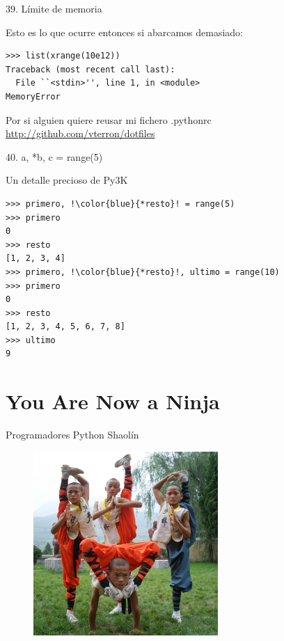 \documentclass[14pt]{beamer}
\begin{document}
\begin{frame}[fragile]{39. Límite de memoria}
  \footnotesize
  \begin{exampleblock}
    {Esto es lo que ocurre entonces si abarcamos demasiado:}
    \begin{lstlisting}
>>> list(xrange(10e12))
Traceback (most recent call last):
  File ``<stdin>'', line 1, in <module>
MemoryError
    \end{lstlisting}
  \end{exampleblock}

  \small
  \begin{block}
    {\centering Por si alguien quiere reusar mi fichero .pythonrc}
    \centering \url{http://github.com/vterron/dotfiles}
  \end{block}
\end{frame}

\begin{frame}[fragile]{40. a, *b, c = range(5)}
  \begin{exampleblock}
    {\centering Un detalle precioso de Py3K}
    \small
    \begin{lstlisting}[escapechar=!]
>>> primero, !\color{blue}{*resto}! = range(5)
>>> primero
0
>>> resto
[1, 2, 3, 4]
>>> primero, !\color{blue}{*resto}!, ultimo = range(10)
>>> primero
0
>>> resto
[1, 2, 3, 4, 5, 6, 7, 8]
>>> ultimo
9
    \end{lstlisting}
  \end{exampleblock}
\end{frame}

\section{You Are Now a Ninja}
\begin{frame}[fragile]{Programadores Python Shaolín}
  \begin{figure}
    \centering
    \includegraphics[height=7cm]{pics/shaolin.jpg}
  \end{figure}
\end{frame}
\end{document}
